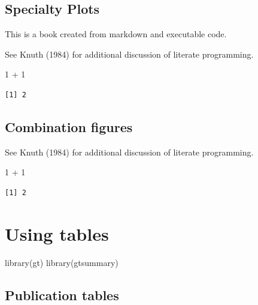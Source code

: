 \documentclass[
  letterpaper,
  DIV=11,
  numbers=noendperiod]{scrreprt}
\newenvironment{Shaded}{\begin{snugshade}}{\end{snugshade}}
\newcommand{\DecValTok}[1]{\textcolor[rgb]{0.68,0.00,0.00}{#1}}
\newcommand{\FunctionTok}[1]{\textcolor[rgb]{0.28,0.35,0.67}{#1}}
\newcommand{\NormalTok}[1]{\textcolor[rgb]{0.00,0.23,0.31}{#1}}
\newcommand{\SpecialCharTok}[1]{\textcolor[rgb]{0.37,0.37,0.37}{#1}}
\begin{document}
\chapter{Specialty Plots}\label{specialty-plots}

This is a book created from markdown and executable code.

See Knuth (1984) for additional discussion of literate programming.

\begin{Shaded}
\begin{Highlighting}[]
\DecValTok{1} \SpecialCharTok{+} \DecValTok{1}
\end{Highlighting}
\end{Shaded}

\begin{verbatim}
[1] 2
\end{verbatim}

\chapter{Combination figures}\label{combination-figures}

See Knuth (1984) for additional discussion of literate programming.

\begin{Shaded}
\begin{Highlighting}[]
\DecValTok{1} \SpecialCharTok{+} \DecValTok{1}
\end{Highlighting}
\end{Shaded}

\begin{verbatim}
[1] 2
\end{verbatim}

\part{Using tables}

\begin{Shaded}
\begin{Highlighting}[]
\FunctionTok{library}\NormalTok{(gt)}
\FunctionTok{library}\NormalTok{(gtsummary)}
\end{Highlighting}
\end{Shaded}

\chapter{Publication tables}\label{publication-tables}
\end{document}
